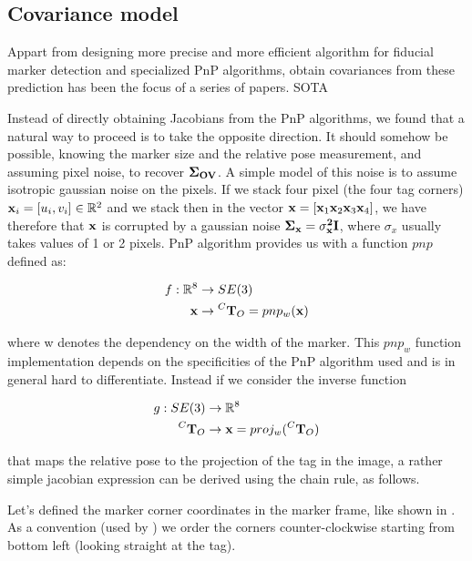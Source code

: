 \subsection{Covariance model}
Appart from designing more precise and more efficient algorithm for fiducial marker detection and specialized PnP algorithms,
 obtain covariances from these prediction has been the focus of a series of papers.
 SOTA

Instead of directly obtaining Jacobians from the PnP algorithms, we found that a natural way to proceed is to take the opposite 
direction. It should somehow be possible, knowing the marker size and the relative pose measurement, and assuming pixel noise, to
recover $\bf \Sigma_{OV}$. A simple model of this noise is to assume isotropic gaussian noise on the pixels. If we stack four pixel (the four tag corners) 
${\bf x}_i = [u_i, v_i] \in \mathbb{R}^2$ and we stack then in the vector ${\bf x} = [{\bf x}_1 {\bf x}_2 {\bf x}_3 {\bf x}_4]$, we have therefore that
${\bf x}$ is corrupted by a gaussian noise $\bf \Sigma_{{\bf x}} = \sigma_{x}^2 {\bf I}$, where $\sigma_{x}$ usually takes values of 1 or 2 pixels.
PnP algorithm provides us with a function $pnp$ defined as:

\begin{equation}
    \begin{split}
        f: \mathbb{R}^8 &\rightarrow SE(3) \\
                           {\bf x} &\rightarrow \prescript{C}{}{{\bf T}}_{O} = pnp_w({\bf x})
    \end{split}
\end{equation}

where w denotes the dependency on the width of the marker. This $pnp_w$ function implementation depends on the specificities of the PnP algorithm used and  
is in general hard to differentiate. Instead if we consider the inverse function

\begin{equation}
    \begin{split}
        g: SE(3) &\rightarrow \mathbb{R}^8 \\
                           \prescript{C}{}{{\bf T}}_{O} &\rightarrow {\bf x} = proj_w(\prescript{C}{}{{\bf T}}_{O})
    \end{split}
\end{equation}

that maps the relative pose to the projection of the tag in the image, a rather simple jacobian expression can be derived using the chain rule, as follows.

Let's defined the marker corner coordinates in the marker frame, like shown in \fig {}. As a convention (used by 
\cite{wang2016iros, collins2014infinitesimal}) we order the corners counter-clockwise starting from bottom left (looking straight at the tag). 

